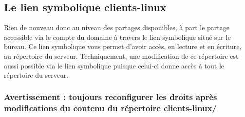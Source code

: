 \subsection{Le lien symbolique clients-linux}

Rien de nouveau donc au niveau des partages disponibles, à part
le partage  accessible via le
compte  du domaine à travers le lien symbolique
 situé sur le bureau. Ce lien symbolique vous permet
d'avoir accès, en lecture et en écriture, au répertoire 
 du serveur.
Techniquement, une modification de ce répertoire est aussi
possible via le lien symbolique  puisque celui-ci
donne accès à tout le répertoire  du serveur.

\subsubsection*{Avertissement : toujours reconfigurer les droits
après modifications du contenu du répertoire clients-linux/}
\label{reconfigurer-droits}

